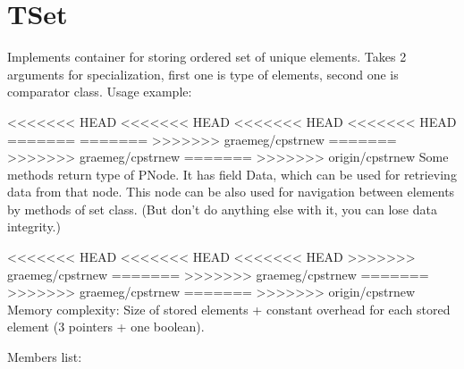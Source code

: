 \chapter{TSet}

Implements container for storing ordered set of unique elements.
Takes 2 arguments for specialization, first one is type of elements, second one is comparator class.
Usage example:



<<<<<<< HEAD
<<<<<<< HEAD
<<<<<<< HEAD
<<<<<<< HEAD
=======
=======
>>>>>>> graemeg/cpstrnew
=======
>>>>>>> graemeg/cpstrnew
=======
>>>>>>> origin/cpstrnew
Some methods return type of PNode. It has field Data, which can be used for retrieving data from
that node. This node can be also used for navigation between elements by methods of set class.
(But don't do anything else with it, you can lose data integrity.)

<<<<<<< HEAD
<<<<<<< HEAD
<<<<<<< HEAD
>>>>>>> graemeg/cpstrnew
=======
>>>>>>> graemeg/cpstrnew
=======
>>>>>>> graemeg/cpstrnew
=======
>>>>>>> origin/cpstrnew
Memory complexity:
Size of stored elements + constant overhead for each stored element (3 pointers + one boolean).

Members list:

